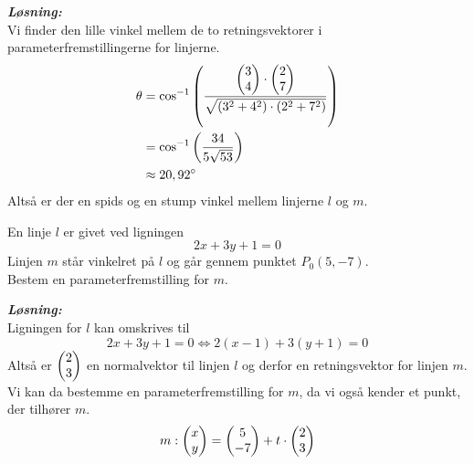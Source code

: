 \documentclass{article}
\newcommand{\sol}{\setlength{\parindent}{0cm}\textbf{\textit{Løsning:}}\setlength{\parindent}{1cm}}
\begin{document}
\sol \\
Vi finder den lille vinkel mellem de to retningsvektorer i parameterfremstillingerne for linjerne.
\begin{equation*}
\begin{split}
  \theta &= \cos^{-1}\left(\frac{\mqty(3\\ 4) \cdot \mqty(2\\ 7) }{\sqrt{(3^2+4^2)\cdot (2^2+7^2)} }\right) \\ 
  &=\cos^{-1}\left(\frac{34}{5 \sqrt{53} }\right) \\ 
  &\approx 20,92 \degree 
\end{split}
\end{equation*}
Altså er der en spids og en stump vinkel mellem linjerne $l$ og $m  $. 
\begin{question}{}{}
 En linje $l$ er givet ved ligningen
  \[
  2x+3y+1=0
  \] 
  Linjen $m  $ står vinkelret på $l$ og går gennem punktet $P_0(5,-7)$. \\ 
  Bestem en parameterfremstilling for $m  $.
\end{question}
\sol \\
Ligningen for $l$ kan omskrives til 
\[
2x+3y+1=0 \iff 2 \left(x-1\right) +3 \left(y+1\right) =0
\] 
Altså er $\mqty(2\\ 3) $ en normalvektor til linjen $l$ og derfor en retningsvektor for linjen $m$. 
Vi kan da bestemme en parameterfremstilling for $m$, da vi også kender et punkt, der tilhører $m$.
\[
m: \mqty(x\\ y) =\mqty(5\\ -7) +t \cdot \mqty(2\\ 3) 
\] 
\end{document}
